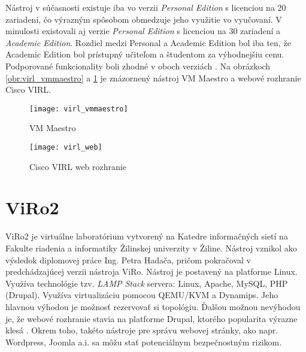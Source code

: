 Nástroj v súčasnosti existuje iba vo verzii \emph{Personal Edition} s licenciou na 20 zariadení, čo výrazným spôsobom obmedzuje jeho využitie vo vyučovaní. V minulosti existovali aj verzie \emph{Personal Edition} s licenciou na 30 zariadení a \emph{Academic Edition}. Rozdiel medzi Personal a Academic Edition bol iba ten, že Academic Edition bol prístupný učiteľom a študentom za výhodnejšiu cenu. Podporované funkcionality boli zhodné v oboch verziách \cite{virl_edition_differences}. Na obrázkoch \ref{obr:virl_vmmaestro} a \ref{obr:virl_web} je znázornený nástroj VM Maestro a webové rozhranie Cisco VIRL.

\begin{figure}
    \centering
    \texttt{[image: virl\_vmmaestro]}
    \caption{VM Maestro} \cite{obr_virl_vmmaestro}
    \label{obr:virl_vmmaestro}

    \vspace{4cm}

    \centering
    \texttt{[image: virl\_web]}
    \caption{Cisco VIRL web rozhranie} \cite{obr_virl_web}
    \label{obr:virl_web}
\end{figure}





\section{ViRo2}

ViRo2 je virtuálne laboratórium vytvorený na Katedre informačných sietí na Fakulte riadenia a informatiky Žilinskej univerzity v Žiline. Nástroj vznikol ako výsledok diplomovej práce Ing. Petra Hadača, pričom pokračoval v predchádzajúcej verzii nástroja ViRo. Nástroj je postavený na platforme Linux. Využíva technológie tzv. \emph{LAMP Stack} servera: Linux, Apache, MySQL, PHP (Drupal). Využíva virtualizáciu pomocou QEMU/KVM a Dynamips. Jeho hlavnou výhodou je možnosť rezervovať si topológiu. Ďalšou možnou nevýhodou je, že webové rozhranie stavia na platforme Drupal, ktorého popularita výrazne klesá \cite{stackoverflow_survey}. Okrem toho, takéto nástroje pre správu webovej stránky, ako napr. Wordpress, Joomla a.i. sa môžu stať potenciálnym bezpečnostným rizikom. \cite{incapsula_cms}

